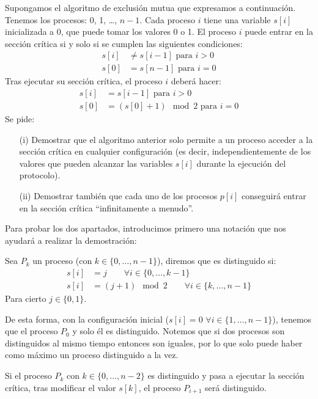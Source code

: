 \begin{ejercicio} %
    Supongamos el algoritmo de exclusión mutua que expresamos a continuación. Tenemos los procesos: 0, 1, \ldots, $n-1$. Cada proceso $i$ tiene una variable $s[i]$ inicializada a 0, que puede tomar los valores 0 o 1. El proceso $i$ puede entrar en la sección crítica si y solo si se cumplen las siguientes condiciones:
    \begin{align*}
        s[i] &\neq s[i-1] \text{\ para\ } i>0 \\
        s[0] &= s[n-1] \text{\ para\ } i = 0
    \end{align*}
    Tras ejecutar su sección crítica, el proceso $i$ deberá hacer:
    \begin{align*}
        s[i] &= s[i-1] \text{\ para\ } i> 0 \\
        s[0] &= (s[0] +1 ) \mod 2 \text{\ para\ } i = 0
    \end{align*}
    Se pide:
    \begin{enumerate}
        \item[(i)] Demostrar que el algoritmo anterior solo permite a un proceso acceder a la sección crítica en cualquier configuración (es decir, independientemente de los valores que pueden alcanzar las variables $s[i]$ durante la ejecución del protocolo).
        \item[(ii)] Demostrar también que cada uno de los procesos $p[i]$ conseguirá entrar en la sección crítica ``infinitamente a menudo''.
    \end{enumerate}
    Para probar los dos apartados, introducimos primero una notación que nos ayudará a realizar la demostración:
    \begin{definicion} Sea $P_k$ un proceso (con $k \in \{0,\ldots,n-1\}$), diremos que es distinguido si:
        \begin{align*}
            s[i] &= j \qquad \forall i \in \{0,\ldots, k-1\} \\
            s[i] &= (j+1) \mod 2 \qquad \forall i \in \{k,\ldots,n-1\}
        \end{align*}
        Para cierto $j \in \{0,1\}$.
    \end{definicion}
    De esta forma, con la configuración inicial ($s[i] = 0$ $\forall i \in \{1,\ldots,n-1\}$), tenemos que el proceso $P_0$ y solo él es distinguido. Notemos que si dos procesos son distinguidos al mismo tiempo entonces son iguales, por lo que solo puede haber como máximo un proceso distinguido a la vez.

    \begin{prop}
        Si el proceso $P_k$ con $k \in \{0,\ldots,n-2\}$ es distinguido y pasa a ejecutar la sección crítica, tras modificar el valor $s[k]$, el proceso $P_{i+1}$ será distinguido.


\end{prop}
\end{ejercicio}
